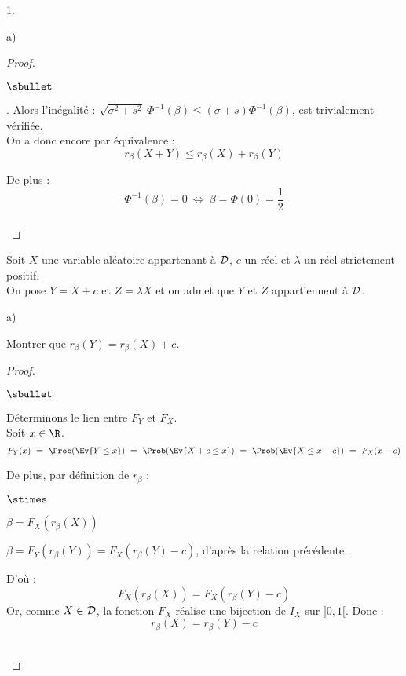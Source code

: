\begin{noliste}{1.}
\begin{noliste}{a)}
\begin{proof}
\begin{noliste}{$\sbullet$}
	\item {}. Alors 
	l'inégalité : $\sqrt{\sigma^2+s^2} \ \Phi^{-1}(\beta)
	\leq (\sigma +s) \Phi^{-1}(\beta)$, est trivialement vérifiée.\\
	On a donc encore par équivalence :
	\[
	  r_{\beta}(X+Y) \leq r_{\beta}(X) + r_{\beta}(Y)
	\]
      \end{noliste}
      De plus :
	\[
	  \Phi^{-1}(\beta) =0 \ \Leftrightarrow \ \beta=
	  \Phi(0)=\dfrac{1}{2}
	\]
      ~\\[-1.2cm]
    \end{proof}
  \end{noliste}
  
  \item Soit $X$ une variable aléatoire appartenant à ${\cal D}$, 
  $c$ un réel et $\lambda$ un réel strictement positif.\\
  On pose $Y=X+c$ et $Z=\lambda X$ et on admet que $Y$ et $Z$ 
  appartiennent à ${\cal D}$.
  \begin{noliste}{a)}
    \setlength{\itemsep}{2mm}
    \item Montrer que $r_\beta(Y)=r_\beta(X)+c$.
    
    \begin{proof}~
      \begin{noliste}{$\sbullet$}
	\item Déterminons le lien entre $F_Y$ et $F_X$.\\
	Soit $x\in \R$.
	\[
	  F_Y(x) \ = \ \Prob(\Ev{Y \leq x})
	  \ = \ \Prob(\Ev{X+c \leq x})
	  \ = \ \Prob(\Ev{X \leq x-c})
	  \ = \ F_X(x-c)
	\]
	\item De plus, par définition de $r_\beta$ :
	\begin{noliste}{$\stimes$}
	  \item $\beta = F_X(r_\beta(X))$
	  \item $\beta = F_Y(r_\beta(Y))=F_X(r_\beta(Y)-c)$, 
	  d'après la relation précédente.
	\end{noliste}
	D'où :
	\[
	  F_X(r_\beta(X)) = F_X(r_\beta(Y)-c)
	\]
	Or, comme $X\in {\cal D}$, la fonction $F_X$ réalise 
	une bijection de $I_X$ sur $]0,1[$. Donc :
	\[
	  r_\beta(X) = r_\beta(Y)-c
	\]
      \end{noliste}
      ~\\[-1cm]
    \end{proof}


\end{noliste}
\end{noliste}
